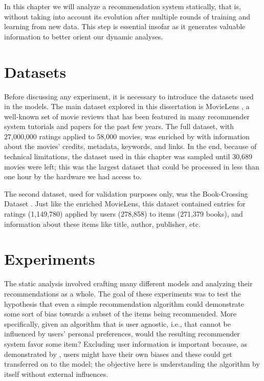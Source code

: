 In this chapter we will analyze a recommendation system statically, that is,
without taking into account its evolution after multiple rounds of training and
learning from new data. This step is essential insofar as it generates valuable
information to better orient our dynamic analyses.

\section{Datasets}
\label{sec:datasets03}

Before discussing any experiment, it is necessary to introduce the datasets used
in the models. The main dataset explored in this dissertation is MovieLens
\citep{harper_movielens_2015}, a well-known set of movie reviews that has been
featured in many recommender system tutorials and papers for the past few years.
The full dataset, with 27,000,000 ratings applied to 58,000 movies, was enriched
by \citet{banik_movies_2017} with information about the movies' credits,
metadata, keywords, and links. In the end, because of technical limitations, the
dataset used in this chapter was sampled until 30,689 movies were left; this was
the largest dataset that could be processed in less than one hour by the
hardware we had access to.

The second dataset, used for validation purposes only, was the Book-Crossing
Dataset \citep{ziegler_book-crossing_2004}. Just like the enriched MovieLens,
this dataset contained entries for ratings (1,149,780) applied by users
(278,858) to items (271,379 books), and information about these items like
title, author, publisher, etc.

\section{Experiments}
\label{sec:experiments}

The static analysis involved crafting many different models and analyzing their
recommendations as a whole. The goal of these experiments was to test the
hypothesis that even a simple recommendation algorithm could demonstrate some
sort of bias towards a subset of the items being recommended. More specifically,
given an algorithm that is user agnostic, i.e., that cannot be influenced by
users' personal preferences, would the resulting recommender system favor some
item? Excluding user information is important because, as demonstrated by
\citet{stoica_algorithmic_2018}, users might have their own biases and these
could get transferred on to the model; the objective here is understanding the
algorithm by itself without external influences.

